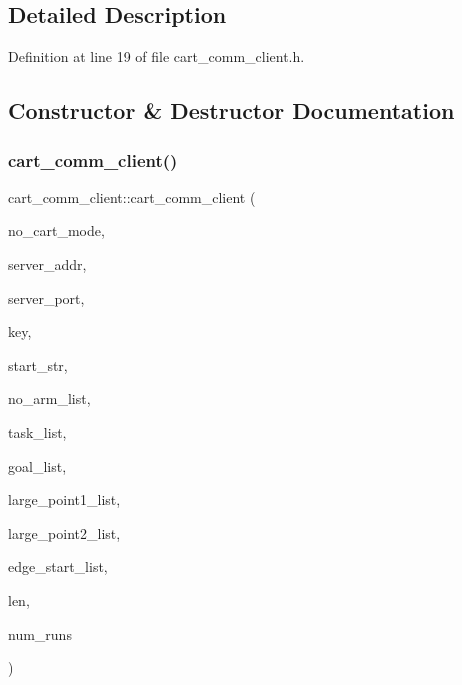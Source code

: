 \subsection{Detailed Description}


Definition at line 19 of file cart\+\_\+comm\+\_\+client.\+h.



\subsection{Constructor \& Destructor Documentation}
\mbox{\label{classcart__comm__client_a23497ab5b62437e0de0d14e1ee25de84}} 
\subsubsection{\texorpdfstring{cart\+\_\+comm\+\_\+client()}{cart\_comm\_client()}}
{\footnotesize\ttfamily cart\+\_\+comm\+\_\+client\+::cart\+\_\+comm\+\_\+client (\begin{DoxyParamCaption}\item[{int}]{no\+\_\+cart\+\_\+mode,  }\item[{char $\ast$}]{server\+\_\+addr,  }\item[{ulapi\+\_\+integer}]{server\+\_\+port,  }\item[{ulapi\+\_\+id}]{key,  }\item[{char $\ast$}]{start\+\_\+str,  }\item[{int $\ast$}]{no\+\_\+arm\+\_\+list,  }\item[{char $\ast$$\ast$}]{task\+\_\+list,  }\item[{\mbox{\hyperlink{structld__msg__pose}{ld\+\_\+msg\+\_\+pose}} $\ast$$\ast$}]{goal\+\_\+list,  }\item[{P\+M\+\_\+\+C\+A\+R\+T\+E\+S\+I\+AN $\ast$$\ast$}]{large\+\_\+point1\+\_\+list,  }\item[{P\+M\+\_\+\+C\+A\+R\+T\+E\+S\+I\+AN $\ast$$\ast$}]{large\+\_\+point2\+\_\+list,  }\item[{P\+M\+\_\+\+C\+A\+R\+T\+E\+S\+I\+AN $\ast$$\ast$}]{edge\+\_\+start\+\_\+list,  }\item[{int}]{len,  }\item[{int}]{num\+\_\+runs }\end{DoxyParamCaption})}

